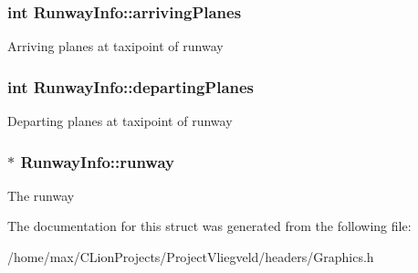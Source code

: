 \subsubsection[{\texorpdfstring{arriving\+Planes}{arrivingPlanes}}]{\setlength{\rightskip}{0pt plus 5cm}int Runway\+Info\+::arriving\+Planes}\hypertarget{structRunwayInfo_a3e3056a401843e8db5c9a8c08a1a692e}{}\label{structRunwayInfo_a3e3056a401843e8db5c9a8c08a1a692e}
Arriving planes at taxipoint of runway 
\subsubsection[{\texorpdfstring{departing\+Planes}{departingPlanes}}]{\setlength{\rightskip}{0pt plus 5cm}int Runway\+Info\+::departing\+Planes}\hypertarget{structRunwayInfo_afc7873501db8d18cd37dead150a3ecb3}{}\label{structRunwayInfo_afc7873501db8d18cd37dead150a3ecb3}
Departing planes at taxipoint of runway 
\subsubsection[{\texorpdfstring{runway}{runway}}]{$\ast$ Runway\+Info\+::runway}\hypertarget{structRunwayInfo_a7c0479aadb72e81995b66406971321c3}{}\label{structRunwayInfo_a7c0479aadb72e81995b66406971321c3}
The runway 

The documentation for this struct was generated from the following file\+:\begin{DoxyCompactItemize}
\item 
/home/max/\+C\+Lion\+Projects/\+Project\+Vliegveld/headers/Graphics.\+h\end{DoxyCompactItemize}
